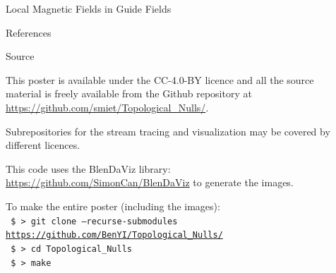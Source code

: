 \documentclass[final]{beamer}
\newlength{\sepwid}
\newlength{\onecolwid}
\begin{document}
\begin{frame}[t]
\begin{columns}[t]
\begin{column}{\onecolwid}
\begin{block}{\huge{Local Magnetic Fields in Guide Fields}}

\end{block}




\begin{block}{References}

\nocite{*} %
\small{
\vspace{0.75in}}

\end{block}

\begin{block}{Source}
\begin{centering}
    \hfill
    \hfill
\end{centering}

	\vspace{1cm}
This poster is available under the  CC-4.0-BY  licence and all the source material is freely
available from the Github repository at \url{https://github.com/smiet/Topological_Nulls/}.

Subrepositories for the stream tracing and visualization may be covered by different licences. 

This code uses the BlenDaViz library: \url{https://github.com/SimonCan/BlenDaViz} to generate the images. 

    To make the entire poster (including the images):\\
\texttt{
	\$ > git clone --recurse-submodules  \url{https://github.com/BenYI/Topological_Nulls/}}\\
\texttt{
    \$ > cd Topological\_Nulls\\
  }
\texttt{
    \$ > make
  }


\end{block}

\end{column}

\begin{column}{\sepwid}\end{column} %


\end{columns} %

\end{frame} %
\end{document}
